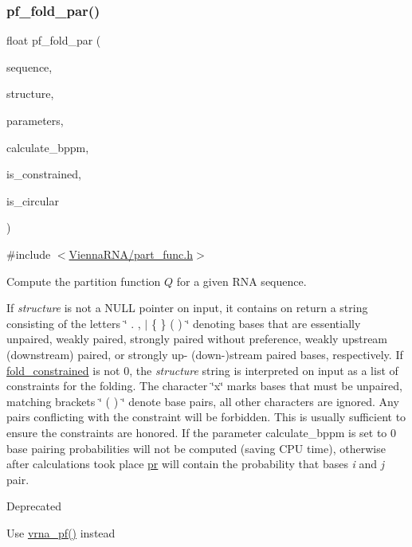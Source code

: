 \subsubsection{\texorpdfstring{pf\+\_\+fold\+\_\+par()}{pf\_fold\_par()}}
{\footnotesize\ttfamily float pf\+\_\+fold\+\_\+par (\begin{DoxyParamCaption}\item[{const char $\ast$}]{sequence,  }\item[{char $\ast$}]{structure,  }\item[{\mbox{\hyperlink{group__energy__parameters_ga01d8b92fe734df8d79a6169482c7d8d8}{vrna\+\_\+exp\+\_\+param\+\_\+t}} $\ast$}]{parameters,  }\item[{int}]{calculate\+\_\+bppm,  }\item[{int}]{is\+\_\+constrained,  }\item[{int}]{is\+\_\+circular }\end{DoxyParamCaption})}



{\ttfamily \#include $<$\mbox{\hyperlink{part__func_8h}{Vienna\+R\+N\+A/part\+\_\+func.\+h}}$>$}



Compute the partition function $Q$ for a given R\+NA sequence. 

If {\itshape structure} is not a N\+U\+LL pointer on input, it contains on return a string consisting of the letters \char`\"{} . , $\vert$ \{ \} ( ) \char`\"{} denoting bases that are essentially unpaired, weakly paired, strongly paired without preference, weakly upstream (downstream) paired, or strongly up-\/ (down-\/)stream paired bases, respectively. If \mbox{\hyperlink{fold__vars_8h_a0afc287c2464866d94858c39175154af}{fold\+\_\+constrained}} is not 0, the {\itshape structure} string is interpreted on input as a list of constraints for the folding. The character \char`\"{}x\char`\"{} marks bases that must be unpaired, matching brackets \char`\"{} ( ) \char`\"{} denote base pairs, all other characters are ignored. Any pairs conflicting with the constraint will be forbidden. This is usually sufficient to ensure the constraints are honored. If the parameter calculate\+\_\+bppm is set to 0 base pairing probabilities will not be computed (saving C\+PU time), otherwise after calculations took place \mbox{\hyperlink{fold__vars_8h_ac98ec419070aee6831b44e5c700f090f}{pr}} will contain the probability that bases {\itshape i} and {\itshape j} pair.

\begin{DoxyRefDesc}{Deprecated}
\item[\mbox{\hyperlink{deprecated__deprecated000103}{Deprecated}}]Use \mbox{\hyperlink{group__pf__fold_ga29e256d688ad221b78d37f427e0e99bc}{vrna\+\_\+pf()}} instead\end{DoxyRefDesc}


